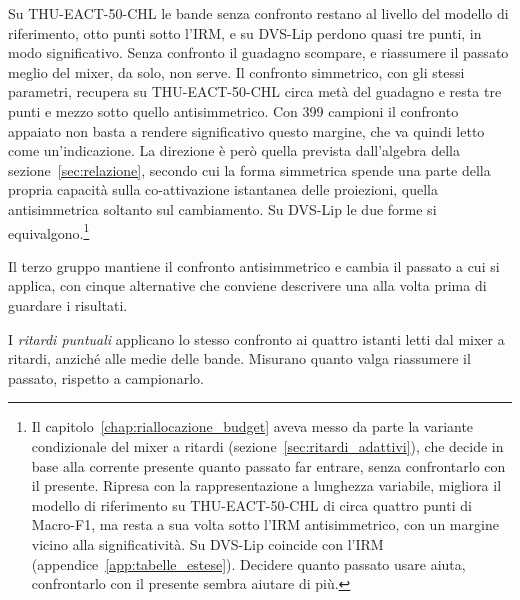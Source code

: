 Su THU-EACT-50-CHL le bande senza confronto restano al livello del modello di riferimento, otto punti sotto l'IRM, e su DVS-Lip perdono quasi tre punti, in modo significativo. Senza confronto il guadagno scompare, e riassumere il passato meglio del mixer, da solo, non serve. Il confronto simmetrico, con gli stessi parametri, recupera su THU-EACT-50-CHL circa metà del guadagno e resta tre punti e mezzo sotto quello antisimmetrico. Con 399 campioni il confronto appaiato non basta a rendere significativo questo margine, che va quindi letto come un'indicazione. La direzione è però quella prevista dall'algebra della sezione~\ref{sec:relazione}, secondo cui la forma simmetrica spende una parte della propria capacità sulla co-attivazione istantanea delle proiezioni, quella antisimmetrica soltanto sul cambiamento. Su DVS-Lip le due forme si equivalgono.\footnote{Il capitolo~\ref{chap:riallocazione_budget} aveva messo da parte la variante condizionale del mixer a ritardi (sezione~\ref{sec:ritardi_adattivi}), che decide in base alla corrente presente quanto passato far entrare, senza confrontarlo con il presente. Ripresa con la rappresentazione a lunghezza variabile, migliora il modello di riferimento su THU-EACT-50-CHL di circa quattro punti di Macro-F1, ma resta a sua volta sotto l'IRM antisimmetrico, con un margine vicino alla significatività. Su DVS-Lip coincide con l'IRM (appendice~\ref{app:tabelle_estese}). Decidere quanto passato usare aiuta, confrontarlo con il presente sembra aiutare di più.}

Il terzo gruppo mantiene il confronto antisimmetrico e cambia il passato a cui si applica, con cinque alternative che conviene descrivere una alla volta prima di guardare i risultati.

I \emph{ritardi puntuali} applicano lo stesso confronto ai quattro istanti letti dal mixer a ritardi, anziché alle medie delle bande. Misurano quanto valga riassumere il passato, rispetto a campionarlo.

